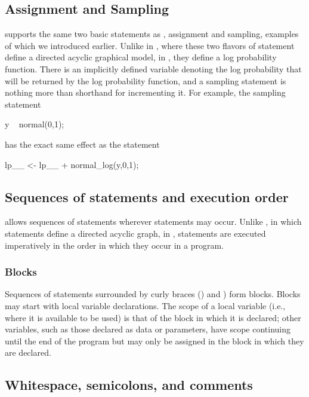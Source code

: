 \documentclass[article]{jss}
\begin{document}
\subsection{Assignment and Sampling}

 supports the same two basic statements as
, assignment and sampling, examples of which we
introduced earlier.  Unlike in , where these two
flavors of statement define a directed acyclic graphical model, in
, they define a log probability function.  There is an
implicitly defined variable  denoting the log probability
that will be returned by the log probability function, and a sampling
statement is nothing more than shorthand for incrementing it.  For
example, the sampling statement
%
\begin{Code}
y ~ normal(0,1);
\end{Code}
%
has the exact same effect as the statement
%
\begin{Code}
lp__ <- lp__ + normal_log(y,0,1);
\end{Code}

\subsection{Sequences of statements and execution order}

 allows sequences of statements wherever statements may
occur. Unlike , in which statements define a directed
acyclic graph, in , statements are executed
imperatively in the order in which they occur in a program.

\subsubsection{Blocks}

Sequences of statements surrounded by curly braces (\code{\{}) and
\code{\}}) form blocks.  Blocks may start with local variable
declarations.  The scope of a local variable (i.e., where it is
available to be used) is that of the block in which it is declared;
other variables, such as those declared as data or parameters, have
scope continuing until the end of the program but may only be assigned
in the block in which they are declared.


\subsection{Whitespace, semicolons, and comments}
\end{document}
